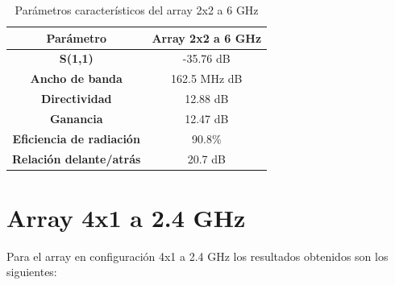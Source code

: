 \begin{table}[H]
  
   
   \small %
   \centering %
   \begin{tabular}{c c} %
   \toprule[\heavyrulewidth]\toprule[\heavyrulewidth]
   \textbf{Parámetro} & \textbf{Array 2x2 a 6 GHz} \\ 
   \midrule
   \textbf{S(1,1)} & -35.76 dB \\
   \textbf{Ancho de banda} & 162.5 MHz dB \\
   \textbf{Directividad} & 12.88 dB \\
   \textbf{Ganancia} & 12.47 dB \\
   \textbf{Eficiencia de radiación} & 90.8\% \\
   \textbf{Relación delante/atrás} & 20.7 dB \\

   \bottomrule[\heavyrulewidth] 
   \end{tabular}
   
   \caption{Parámetros característicos del array 2x2 a 6 GHz} 
   \label{tab:res2x22}
\end{table}




















\section{Array 4x1 a 2.4 GHz}
\par Para el array en configuración 4x1 a 2.4 GHz los resultados obtenidos son los siguientes:

